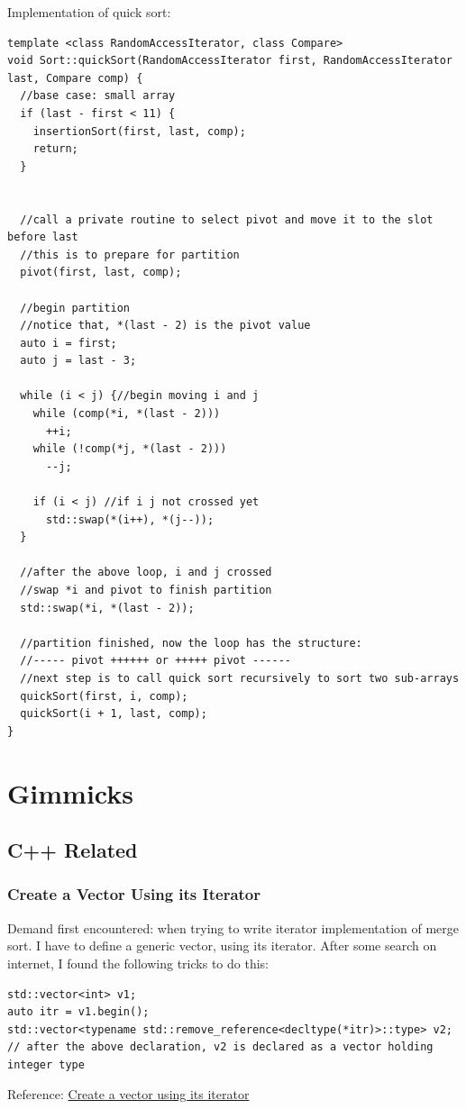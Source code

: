 \documentclass[11pt]{book}
\begin{document}
Implementation of quick sort:
\begin{verbatim}
template <class RandomAccessIterator, class Compare>
void Sort::quickSort(RandomAccessIterator first, RandomAccessIterator last, Compare comp) {
  //base case: small array
  if (last - first < 11) {
    insertionSort(first, last, comp);
    return;
  }


  //call a private routine to select pivot and move it to the slot before last 
  //this is to prepare for partition
  pivot(first, last, comp);

  //begin partition
  //notice that, *(last - 2) is the pivot value
  auto i = first;
  auto j = last - 3;

  while (i < j) {//begin moving i and j
    while (comp(*i, *(last - 2)))
      ++i;
    while (!comp(*j, *(last - 2)))
      --j;

    if (i < j) //if i j not crossed yet
      std::swap(*(i++), *(j--));
  }

  //after the above loop, i and j crossed
  //swap *i and pivot to finish partition
  std::swap(*i, *(last - 2));

  //partition finished, now the loop has the structure:
  //----- pivot ++++++ or +++++ pivot ------
  //next step is to call quick sort recursively to sort two sub-arrays
  quickSort(first, i, comp);
  quickSort(i + 1, last, comp); 
}
\end{verbatim}

\part{Gimmicks}
\label{sec:orga52e10e}
\chapter{C++ Related}
\label{sec:orge3356d9}
\section{Create a Vector Using its Iterator}
\label{sec:org174deec}
Demand first encountered: when trying to write iterator implementation of merge sort. I have to define a generic vector, using its iterator. After some search on internet, I found the following tricks to do this:
\begin{verbatim}
std::vector<int> v1;
auto itr = v1.begin();
std::vector<typename std::remove_reference<decltype(*itr)>::type> v2;
// after the above declaration, v2 is declared as a vector holding integer type
\end{verbatim}

Reference:
\href{https://stackoverflow.com/questions/45217180/initializing-a-vector-of-auto-unknown-type-inside-a-template-function-in-c}{Create a vector using its iterator}
\end{document}
